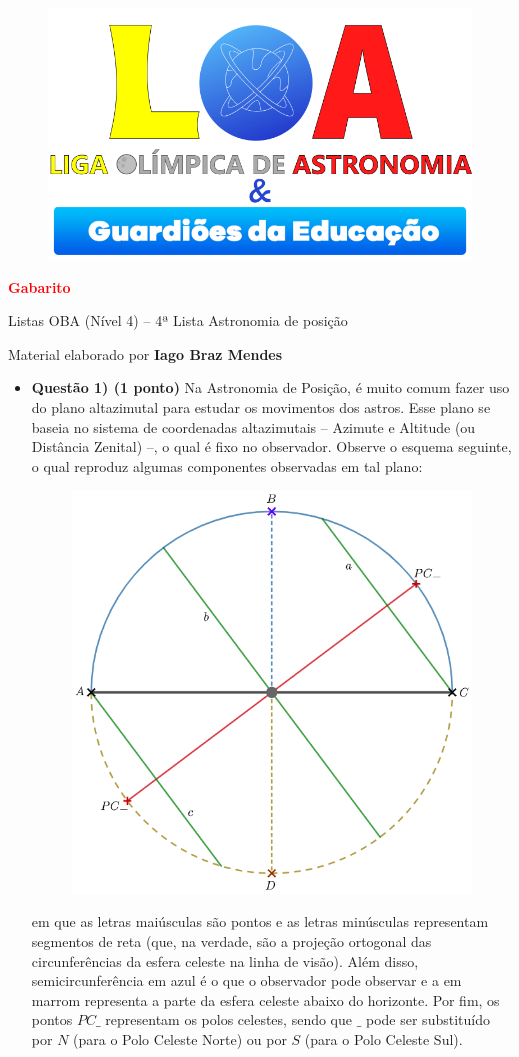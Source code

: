 \documentclass[a4paper, 12pt]{article}
\newcommand{\red}[1]{\textcolor{red}{#1}}
\newcommand{\cabecalho}[4]
{
	\begin{figure}
		\centering
		\href{https://ligaolimpicadeastronomia.com.br/}{\includegraphics[scale=0.6]{./img/logos.png}}
	\end{figure}
	
	\begin{center}
		\begin{large}
			\textbf{#1}	
		\end{large}
			\linebreak Listas OBA (Nível 4) -- #2ª Lista
			\linebreak #3
		\end{center}
	
	\begin{flushright}
		Material elaborado por \textbf{#4}
	\end{flushright}
}
\begin{document}
	\cabecalho{\red{Gabarito}}{4}{Astronomia de posição}{Iago Braz Mendes}
	
	\begin{flushleft}
	\begin{itemize}
		\item \textbf{Questão 1) (1 ponto)} Na Astronomia de Posição, é muito comum fazer uso do plano altazimutal para estudar os movimentos dos astros. Esse plano se baseia no sistema de coordenadas altazimutais -- Azimute e Altitude (ou Distância Zenital) --, o qual é fixo no observador. Observe o esquema seguinte, o qual reproduz algumas componentes observadas em tal plano:
			\begin{figure}[H]
				\centering
				\includegraphics[scale=0.5]{./img/1.png}
			\end{figure}
			em que as letras maiúsculas são pontos e as letras minúsculas representam segmentos de reta (que, na verdade, são a projeção ortogonal das circunferências da esfera celeste na linha de visão). Além disso, semicircunferência em azul é o que o observador pode observar e a em marrom representa a parte da esfera celeste abaixo do horizonte. Por fim, os pontos $PC\_$ representam os polos celestes, sendo que $\_$ pode ser substituído por $N$ (para o Polo Celeste Norte) ou por $S$ (para o Polo Celeste Sul).
			\begin{itemize}

\end{itemize}
\end{itemize}
\end{flushleft}
\end{document}
